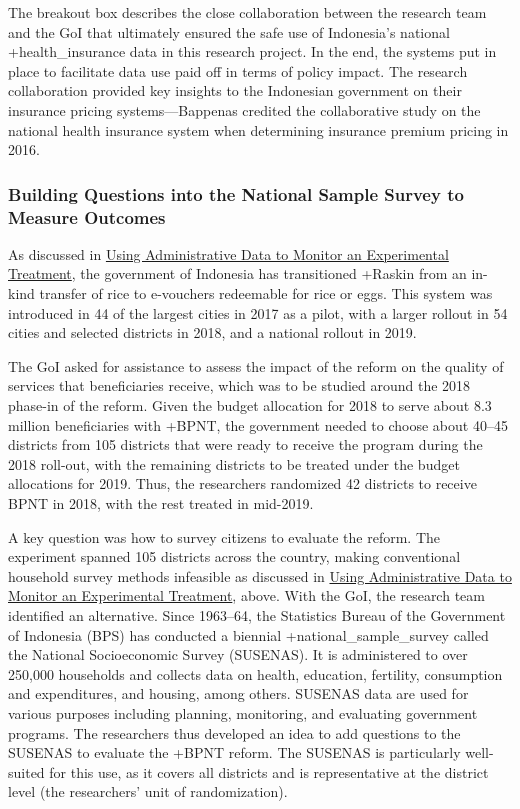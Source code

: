 \documentclass[
]{WileySix}
\begin{document}
The breakout box describes the close collaboration between the research team and the GoI that ultimately ensured the safe use of Indonesia's national +health\_insurance\textbar{} data in this research project. In the end, the systems put in place to facilitate data use paid off in terms of policy impact. The research collaboration provided key insights to the Indonesian government on their insurance pricing systems---Bappenas credited the collaborative study on the national health insurance system when determining insurance premium pricing in 2016.

\hypertarget{building-questions-into-the-national-sample-survey-to-measure-outcomes}{%
\subsubsection{Building Questions into the National Sample Survey to Measure Outcomes}\label{building-questions-into-the-national-sample-survey-to-measure-outcomes}}

As discussed in \protect\hyperlink{using-administrative-data-to-monitor-an-experimental-treatment}{Using Administrative Data to Monitor an Experimental Treatment}, the government of Indonesia has transitioned +Raskin\textbar{} from an in-kind transfer of rice to e-vouchers redeemable for rice or eggs. This system was introduced in 44 of the largest cities in 2017 as a pilot, with a larger rollout in 54 cities and selected districts in 2018, and a national rollout in 2019.

The GoI asked for assistance to assess the impact of the reform on the quality of services that beneficiaries receive, which was to be studied around the 2018 phase-in of the reform. Given the budget allocation for 2018 to serve about 8.3 million beneficiaries with +BPNT\textbar, the government needed to choose about 40--45 districts from 105 districts that were ready to receive the program during the 2018 roll-out, with the remaining districts to be treated under the budget allocations for 2019. Thus, the researchers randomized 42 districts to receive BPNT in 2018, with the rest treated in mid-2019.

A key question was how to survey citizens to evaluate the reform. The experiment spanned 105 districts across the country, making conventional household survey methods infeasible as discussed in \protect\hyperlink{using-administrative-data-to-monitor-an-experimental-treatment}{Using Administrative Data to Monitor an Experimental Treatment}, above. With the GoI, the research team identified an alternative. Since 1963--64, the Statistics Bureau of the Government of Indonesia (BPS) has conducted a biennial +national\_sample\_survey\textbar{} called the National Socioeconomic Survey (SUSENAS). It is administered to over 250,000 households and collects data on health, education, fertility, consumption and expenditures, and housing, among others. SUSENAS data are used for various purposes including planning, monitoring, and evaluating government programs. The researchers thus developed an idea to add questions to the SUSENAS to evaluate the +BPNT\textbar{} reform. The SUSENAS is particularly well-suited for this use, as it covers all districts and is representative at the district level (the researchers' unit of randomization).
\end{document}
